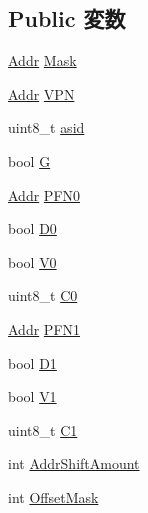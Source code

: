 \subsection*{Public 変数}
\begin{DoxyCompactItemize}
\item 
\hyperlink{classm5_1_1params_1_1Addr}{Addr} \hyperlink{structMipsISA_1_1PTE_a55c80cc6dd4632d4322394ed691ac560}{Mask}
\item 
\hyperlink{classm5_1_1params_1_1Addr}{Addr} \hyperlink{structMipsISA_1_1PTE_a828b555e1478c60407431dd9f779f208}{VPN}
\item 
uint8\_\-t \hyperlink{structMipsISA_1_1PTE_a79b438bb35263e6b3db98c5390a93516}{asid}
\item 
bool \hyperlink{structMipsISA_1_1PTE_adc50817b9a5196dce387a27280cf2c2c}{G}
\item 
\hyperlink{classm5_1_1params_1_1Addr}{Addr} \hyperlink{structMipsISA_1_1PTE_ae07af9e304b40a172b73d912d81635a2}{PFN0}
\item 
bool \hyperlink{structMipsISA_1_1PTE_a5d65319c8ed6ef4b4c18547773a4ccf9}{D0}
\item 
bool \hyperlink{structMipsISA_1_1PTE_aef8a8ddc9558c9cff93b2610dddea958}{V0}
\item 
uint8\_\-t \hyperlink{structMipsISA_1_1PTE_a88317928f6b49bb03517258dd5fd5423}{C0}
\item 
\hyperlink{classm5_1_1params_1_1Addr}{Addr} \hyperlink{structMipsISA_1_1PTE_ab1961d83479850fdb160aec644e973fc}{PFN1}
\item 
bool \hyperlink{structMipsISA_1_1PTE_ad13637cf05908806c978328c392d8edf}{D1}
\item 
bool \hyperlink{structMipsISA_1_1PTE_a2de020451ec6119f325bc89847d6f44a}{V1}
\item 
uint8\_\-t \hyperlink{structMipsISA_1_1PTE_a8286c9d870f31a089d95e6a2285fbe2f}{C1}
\item 
int \hyperlink{structMipsISA_1_1PTE_a2426034b7edbceda79a55a0ca28ac68e}{AddrShiftAmount}
\item 
int \hyperlink{structMipsISA_1_1PTE_aef54c305cf60db572e0a9248660ec0d3}{OffsetMask}
\end{DoxyCompactItemize}


